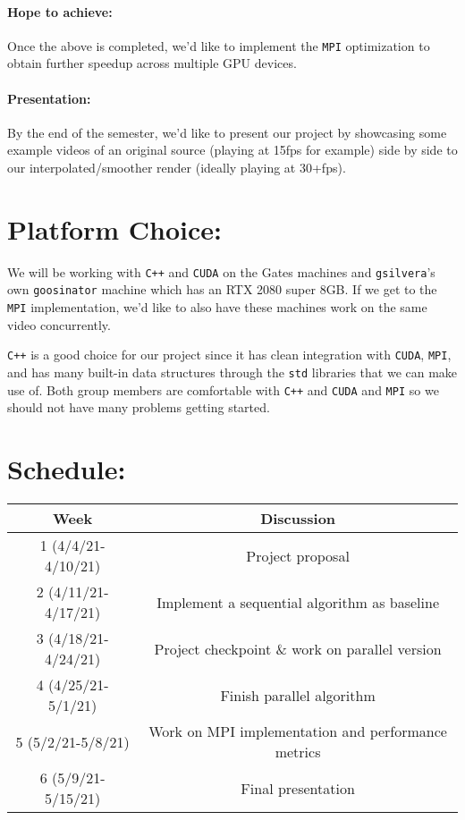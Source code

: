 \documentclass[12pt]{article}
\begin{document}
\paragraph{Hope to achieve:}
\par Once the above is completed, we'd like to implement the \texttt{MPI} optimization to obtain further speedup across multiple GPU devices. 
\paragraph{Presentation:}
\par By the end of the semester, we'd like to present our project by showcasing some example videos of an original source (playing at 15fps for example) side by side to our interpolated/smoother render (ideally playing at 30+fps).

\section*{Platform Choice:}
\par We will be working with \texttt{C++} and \texttt{CUDA} on the Gates machines and \texttt{gsilvera}'s own \texttt{goosinator} machine which has an RTX 2080 super 8GB. If we get to the \texttt{MPI} implementation, we'd like to also have these machines work on the same video concurrently. 
\par \texttt{C++} is a good choice for our project since it has clean integration with \texttt{CUDA}, \texttt{MPI}, and has many built-in data structures through the \texttt{std} libraries that we can make use of. Both group members are comfortable with \texttt{C++} and \texttt{CUDA} and \texttt{MPI} so we should not have many problems getting started.  

\section*{Schedule:}

\begin{center}
	\begin{tabular}{ |c|c| } 
		\hline
		Week & Discussion \\
		\hline
		1 (4/4/21-4/10/21) & Project proposal\\ 
		\hline
		2 (4/11/21-4/17/21) & Implement a sequential algorithm as baseline\\
		\hline
		3 (4/18/21-4/24/21) & Project checkpoint \& work on parallel version \\
		\hline
		4 (4/25/21-5/1/21) & Finish parallel algorithm\\
		\hline
		5 (5/2/21-5/8/21) & Work on MPI implementation and performance metrics\\
		\hline
		6 (5/9/21-5/15/21) & Final presentation \\
		\hline
	\end{tabular}\\
\end{center}
\end{document}
